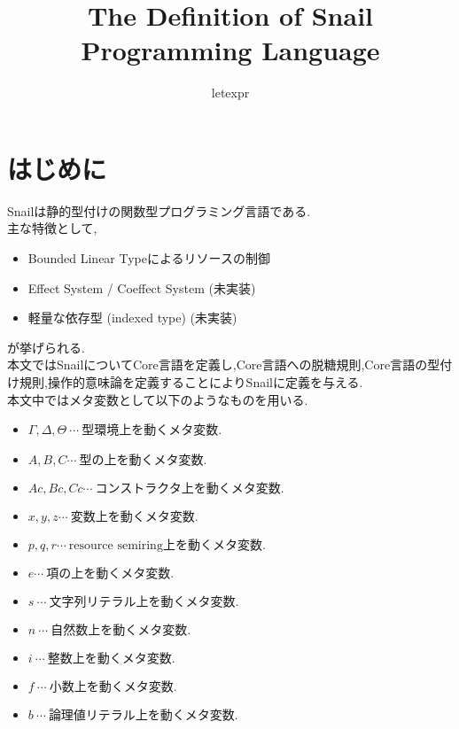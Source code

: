 \documentclass{jsarticle}
\title{The Definition of Snail Programming Language}
\author{letexpr}
\begin{document}
\maketitle

\section{はじめに}

Snailは静的型付けの関数型プログラミング言語である.\\

主な特徴として,
\begin{itemize}
  \item Bounded Linear Typeによるリソースの制御
  \item Effect System / Coeffect System (未実装)
  \item 軽量な依存型 (indexed type) (未実装)
\end{itemize}

が挙げられる.\\

本文ではSnailについてCore言語を定義し,Core言語への脱糖規則,Core言語の型付け規則,操作的意味論を定義することによりSnailに定義を与える.\\

本文中ではメタ変数として以下のようなものを用いる.
\begin{itemize}
  \item $\Gamma , \Delta , \Theta\ \cdots\ \mbox{型環境上を動くメタ変数}$.
  \item $A,B,C \cdots\ \mbox{型の上を動くメタ変数.}$
  \item $Ac,Bc,Cc \cdots\ \mbox{コンストラクタ上を動くメタ変数.}$
  \item $x,y,z \cdots\ \mbox{変数上を動くメタ変数.}$
  \item $p,q,r \cdots\ \mbox{resource semiring上を動くメタ変数.}$
  \item $e \cdots\ \mbox{項の上を動くメタ変数.}$
  \item $s\ \cdots\ \mbox{文字列リテラル上を動くメタ変数.}$
  \item $n\ \cdots\ \mbox{自然数上を動くメタ変数.}$
  \item $i\ \cdots\ \mbox{整数上を動くメタ変数.}$
  \item $f\ \cdots\ \mbox{小数上を動くメタ変数.}$
  \item $b\ \cdots\ \mbox{論理値リテラル上を動くメタ変数.}$
\end{itemize}

\newpage
\end{document}
